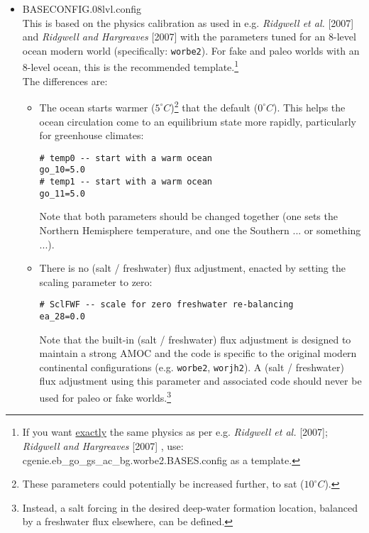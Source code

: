 \documentclass[11pt,fleqn]{book} %
\begin{document}
\begin{itemize}[noitemsep]

\vspace{2mm}
\item \textsf{\small BASECONFIG.08lvl.config}
\vspace{1mm}
\\This is based on the physics calibration as used in e.g. \textit{Ridgwell et al.} [2007] and \textit{Ridgwell and Hargreaves} [2007] with the parameters tuned for an 8-level ocean modern world (specifically: \texttt{worbe2}). For fake and paleo worlds with an 8-level ocean, this is the recommended template.\footnote{If you want \uline{exactly} the same physics as per e.g. \textit{Ridgwell et al.} [2007];  \textit{Ridgwell and Hargreaves} [2007] , use: \linebreak\textsf{\footnotesize cgenie.eb\_go\_gs\_ac\_bg.worbe2.BASES.config} as a template.}
\\The differences are:
\pagebreak
\begin{itemize}[noitemsep]
\vspace{1mm}
\item The ocean starts warmer (\(5^{\circ}C\))\footnote{These parameters could potentially be increased further, to sat (\(10^{\circ}C\)).} that the default (\(0^{\circ}C\)). This helps the ocean circulation come to an equilibrium state more rapidly, particularly for greenhouse climates:
\small\vspace{-2pt}\begin{verbatim}
# temp0 -- start with a warm ocean
go_10=5.0
# temp1 -- start with a warm ocean
go_11=5.0
\end{verbatim}\vspace{-2pt}\normalsize
Note that both parameters should be changed together (one sets the Northern Hemisphere temperature, and one the Southern ... or something ...).
\vspace{1mm}
\item There is no (salt / freshwater) flux adjustment, enacted by setting the scaling parameter to zero:
\small\vspace{-2pt}\begin{verbatim}
# SclFWF -- scale for zero freshwater re-balancing
ea_28=0.0
\end{verbatim}\vspace{-2pt}\normalsize
Note that the built-in (salt / freshwater) flux adjustment is designed to maintain a strong AMOC and the code is specific to the original modern continental configurations (e.g. \texttt{worbe2}, \texttt{worjh2}). A (salt / freshwater) flux adjustment using this parameter and associated code should never be used for paleo or fake worlds.\footnote{Instead, a salt forcing in the desired deep-water formation location, balanced by a freshwater flux elsewhere, can be defined.}

\end{itemize}
\end{itemize}
\end{document}
